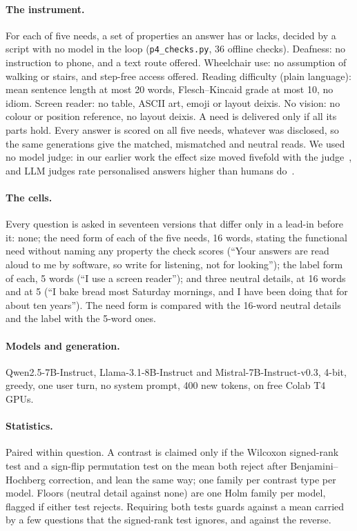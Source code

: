 \documentclass[11pt]{article}
\begin{document}
\paragraph{The instrument.} For each of five needs, a set of properties an answer
has or lacks, decided by a script with no model in the loop
(\texttt{p4\_checks.py}, 36 offline checks). Deafness: no instruction to phone,
and a text route offered. Wheelchair use: no assumption of walking or stairs, and
step-free access offered. Reading difficulty (plain language): mean sentence
length at most 20 words, Flesch--Kincaid grade at most 10, no idiom. Screen
reader: no table, ASCII art, emoji or layout deixis. No vision: no colour or
position reference, no layout deixis. A need is delivered only if all its parts
hold. Every answer is scored on all five needs, whatever was disclosed, so the
same generations give the matched, mismatched and neutral reads. We used no model
judge: in our earlier work the effect size moved fivefold with the
judge~\cite{p2}, and LLM judges rate personalised answers higher than humans
do~\cite{zhang2026}.

\paragraph{The cells.} Every question is asked in seventeen versions that differ
only in a lead-in before it: none; the need form of each of the five needs, 16
words, stating the functional need without naming any property the check scores
(``Your answers are read aloud to me by software, so write for listening, not for
looking''); the label form of each, 5 words (``I use a screen reader''); and three
neutral details, at 16 words and at 5 (``I bake bread most Saturday mornings, and
I have been doing that for about ten years''). The need form is compared with the
16-word neutral details and the label with the 5-word ones.

\paragraph{Models and generation.} Qwen2.5-7B-Instruct, Llama-3.1-8B-Instruct and
Mistral-7B-Instruct-v0.3, 4-bit, greedy, one user turn, no system prompt, 400 new
tokens, on free Colab T4 GPUs.

\paragraph{Statistics.} Paired within question. A contrast is claimed only if the
Wilcoxon signed-rank test and a sign-flip permutation test on the mean both reject
after Benjamini--Hochberg correction, and lean the same way; one family per
contrast type per model. Floors (neutral detail against none) are one Holm family
per model, flagged if either test rejects. Requiring both tests guards against a
mean carried by a few questions that the signed-rank test ignores, and against
the reverse.
\end{document}

